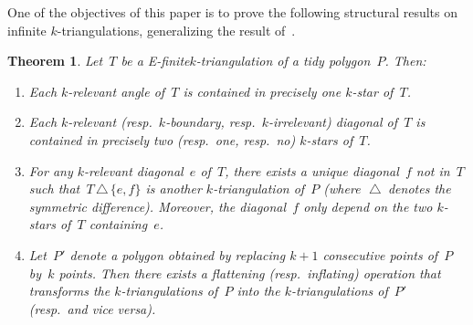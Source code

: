 \documentclass{amsart}
\newtheorem{theorem}{Theorem}[section]
\theoremstyle{remark}
\newcommand{\symdif}{\,\triangle\,} %
\newcommand{\viceversa}{\textit{vice versa}} %
\newcommand*{\ef}[0]{E-finite\xspace}
\newcommand*{\ktg}[0]{$k$-triangulation\xspace}
\begin{document}
One of the objectives of this paper is to prove the following structural results on infinite $k$-triangulations, generalizing the result of~\cite{PilaudSantos-multitriangulations}.

\begin{theorem}
\label{thm:structureInfinite}
Let~$T$ be a \ef \ktg of a tidy polygon~$P$. Then:
\begin{enumerate}
\item Each $k$-relevant angle of~$T$ is contained in precisely one $k$-star of~$T$.
\item Each $k$-relevant (resp.~$k$-boundary, resp.~$k$-irrelevant) diagonal of~$T$ is contained in precisely two (resp.~one, resp.~no) $k$-stars of~$T$.
\item For any $k$-relevant diagonal~$e$ of~$T$, there exists a unique diagonal~$f$ not in~$T$ such that~$T \symdif \{e,f\}$ is another $k$-triangulation of~$P$ (where~$\symdif$ denotes the symmetric difference). Moreover, the diagonal~$f$ only depend on the two $k$-stars of~$T$ containing~$e$.
\item Let~$P'$ denote a polygon obtained by replacing $k+1$ consecutive points of~$P$ by~$k$ points. Then there exists a flattening (resp.~inflating) operation that transforms the \ktg{}s of~$P$ into the \ktg{}s of~$P'$ (resp.~and \viceversa).
\end{enumerate}
\end{theorem}
\end{document}
